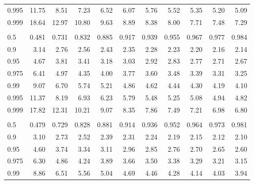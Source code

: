 \documentclass[]{article}
\begin{document}
\begin{table}[H]
\begin{tabular}{lrrrrrrrrrr}
\hspace{1em}0.995 & 11.75 & 8.51 & 7.23 & 6.52 & 6.07 & 5.76 & 5.52 & 5.35 & 5.20 & 5.09\\
\hspace{1em}0.999 & 18.64 & 12.97 & 10.80 & 9.63 & 8.89 & 8.38 & 8.00 & 7.71 & 7.48 & 7.29\\
\addlinespace[0.3em]
\multicolumn{11}{l}{\textbf{$k_2=13$}}\\
\hspace{1em}0.5 & 0.481 & 0.731 & 0.832 & 0.885 & 0.917 & 0.939 & 0.955 & 0.967 & 0.977 & 0.984\\
\hspace{1em}0.9 & 3.14 & 2.76 & 2.56 & 2.43 & 2.35 & 2.28 & 2.23 & 2.20 & 2.16 & 2.14\\
\hspace{1em}0.95 & 4.67 & 3.81 & 3.41 & 3.18 & 3.03 & 2.92 & 2.83 & 2.77 & 2.71 & 2.67\\
\hspace{1em}0.975 & 6.41 & 4.97 & 4.35 & 4.00 & 3.77 & 3.60 & 3.48 & 3.39 & 3.31 & 3.25\\
\hspace{1em}0.99 & 9.07 & 6.70 & 5.74 & 5.21 & 4.86 & 4.62 & 4.44 & 4.30 & 4.19 & 4.10\\
\hspace{1em}0.995 & 11.37 & 8.19 & 6.93 & 6.23 & 5.79 & 5.48 & 5.25 & 5.08 & 4.94 & 4.82\\
\hspace{1em}0.999 & 17.82 & 12.31 & 10.21 & 9.07 & 8.35 & 7.86 & 7.49 & 7.21 & 6.98 & 6.80\\
\addlinespace[0.3em]
\multicolumn{11}{l}{\textbf{$k_2=14$}}\\
\hspace{1em}0.5 & 0.479 & 0.729 & 0.828 & 0.881 & 0.914 & 0.936 & 0.952 & 0.964 & 0.973 & 0.981\\
\hspace{1em}0.9 & 3.10 & 2.73 & 2.52 & 2.39 & 2.31 & 2.24 & 2.19 & 2.15 & 2.12 & 2.10\\
\hspace{1em}0.95 & 4.60 & 3.74 & 3.34 & 3.11 & 2.96 & 2.85 & 2.76 & 2.70 & 2.65 & 2.60\\
\hspace{1em}0.975 & 6.30 & 4.86 & 4.24 & 3.89 & 3.66 & 3.50 & 3.38 & 3.29 & 3.21 & 3.15\\
\hspace{1em}0.99 & 8.86 & 6.51 & 5.56 & 5.04 & 4.69 & 4.46 & 4.28 & 4.14 & 4.03 & 3.94\\

\end{tabular}
\end{table}
\end{document}
